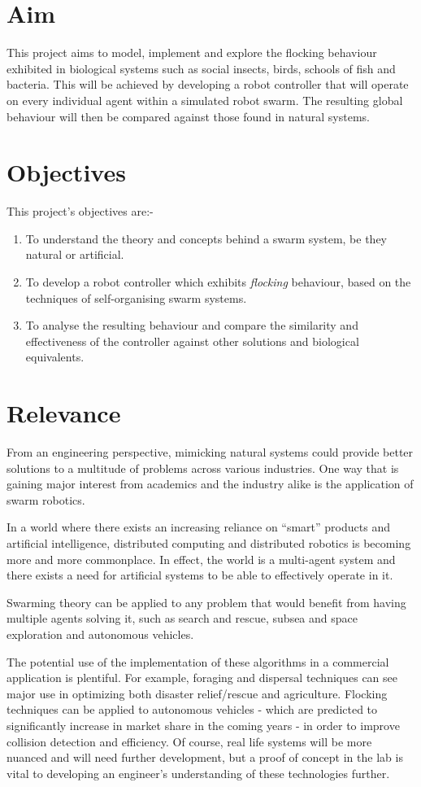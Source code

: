 \section{Aim}
This project aims to model, implement and explore the flocking behaviour exhibited in biological systems such as social insects, birds, schools of fish and bacteria. This will be achieved by developing a robot controller that will operate on every individual agent within a simulated robot swarm. The resulting global behaviour will then be compared against those found in natural systems.


\section{Objectives}
 This project's objectives are:-

\begin{enumerate}
	\item To understand the theory and concepts behind a swarm system, be they natural or artificial.
	\item To develop a robot controller which exhibits \textit{flocking} behaviour, based on the techniques of self-organising swarm systems.
	\item To analyse the resulting behaviour and compare the similarity and effectiveness of the controller against other solutions and biological equivalents.
\end{enumerate}

\section{Relevance}

From an engineering perspective, mimicking natural systems could provide better solutions to a multitude of problems across various industries. One way that is gaining major interest from academics and the industry alike is the application of swarm robotics.

In a world where there exists an increasing reliance on ``smart'' products and artificial intelligence, distributed computing and distributed robotics is becoming more and more commonplace. In effect, the world is a multi-agent system and there exists a need for artificial systems to be able to effectively operate in it.

Swarming theory can be applied to any problem that would benefit from having multiple agents solving it, such as search and rescue, subsea and space exploration and autonomous vehicles. 

The potential use of the implementation of these algorithms in a commercial application is plentiful. For example, foraging and dispersal techniques can see major use in optimizing both disaster relief/rescue and agriculture. Flocking techniques can be applied to autonomous vehicles - which are predicted to significantly increase in market share in the coming years - in order to improve collision detection and efficiency. Of course, real life systems will be more nuanced and will need further development, but a proof of concept in the lab is vital to developing an engineer's understanding of these technologies further.

